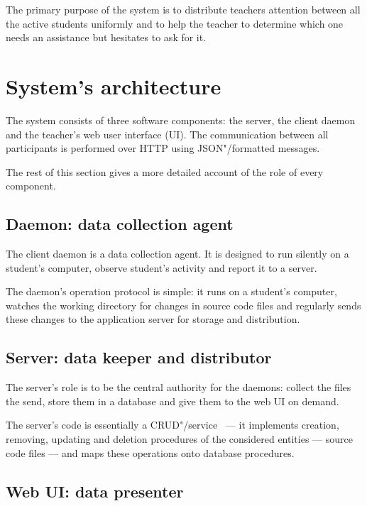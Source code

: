 The primary purpose of the system is to distribute teachers attention between
all the active students uniformly and to help the teacher to determine which one
needs an assistance but hesitates to ask for it.

\section{System's architecture}



The system consists of three software components: the server, the client daemon and the
teacher's web user interface (UI). The communication between all participants is performed
over HTTP using JSON"/formatted messages.

The rest of this section gives a more detailed account of the role of every component.

\subsection{Daemon: data collection agent}

The client daemon is a data collection agent. It is designed to run silently on
a student's computer, observe student's activity and report it to a server.

The daemon's operation protocol is simple: it runs on a student's computer,
watches the working directory for changes in source code files and regularly sends
these changes to the application server for storage and distribution.

\subsection{Server: data keeper and distributor}

The server's role is to be the central authority for the daemons: collect the files
the send, store them in a database and give them to the web UI on demand.

The server's code is essentially a CRUD"/service~\cite{Martin:1983:MDB:538746} ---
it implements creation, removing, updating and deletion procedures of the considered
entities --- source code files  --- and maps these operations onto database procedures.

\subsection{Web UI: data presenter}

